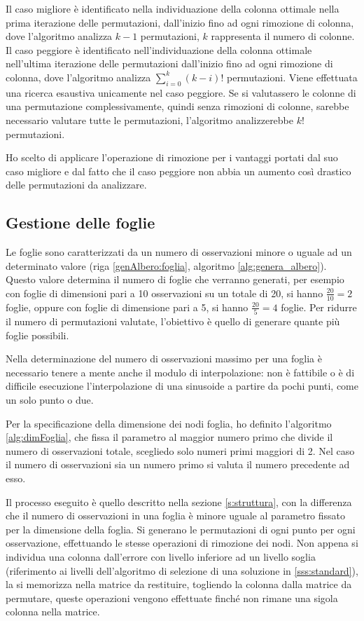 \documentclass[a4paper,12pt]{report}
\begin{document}
    Il caso migliore è identificato nella individuazione della colonna ottimale nella prima iterazione delle permutazioni, dall'inizio fino ad ogni rimozione di colonna, dove l'algoritmo analizza $k-1$ permutazioni, $k$ rappresenta il numero di colonne. Il caso peggiore è identificato nell'individuazione della colonna ottimale nell'ultima iterazione delle permutazioni dall'inizio fino ad ogni rimozione di colonna, dove l'algoritmo analizza  $\sum_{i=0}^k (k-i)!$ permutazioni.
    Viene effettuata una ricerca esaustiva unicamente nel caso peggiore.
    Se si valutassero le colonne di una permutazione complessivamente, quindi senza rimozioni di colonne, sarebbe necessario valutare tutte le permutazioni, l'algoritmo analizzerebbe $k!$ permutazioni.

    Ho scelto di applicare l'operazione di rimozione per i vantaggi portati dal suo caso migliore e dal fatto che il caso peggiore non abbia un aumento così drastico delle permutazioni da analizzare.


  \subsection{Gestione delle foglie}
  Le foglie sono caratterizzati da un numero di osservazioni minore o uguale ad un determinato valore (riga \ref{genAlbero:foglia}, algoritmo \ref{alg:genera_albero}). Questo valore determina il numero di foglie che verranno generati, per esempio con foglie di dimensioni pari a 10 osservazioni su un totale di 20, si hanno $\frac{20}{10} = 2$ foglie, oppure con foglie di dimensione pari a 5, si hanno $\frac{20}{5} = 4$ foglie. Per ridurre il numero di permutazioni valutate, l'obiettivo è quello di generare quante più foglie possibili.

  Nella determinazione del numero di osservazioni massimo per una foglia è necessario tenere a mente anche il modulo di interpolazione: non è fattibile o è di difficile esecuzione l'interpolazione di una sinusoide a partire da pochi punti, come un solo punto o due.

  Per la specificazione della dimensione dei nodi foglia, ho definito l'algoritmo \ref{alg:dimFoglia}, che fissa il parametro al maggior numero primo che divide il numero di osservazioni totale, scegliedo solo numeri primi maggiori di 2. Nel caso il numero di osservazioni sia un numero primo si valuta il numero precedente ad esso.

  Il processo eseguito è quello descritto nella sezione \ref{s:struttura}, con la differenza che il numero di osservazioni in una foglia è minore uguale al parametro fissato per la dimensione della foglia.
  Si generano le permutazioni di ogni punto per ogni osservazione, effettuando le stesse operazioni di rimozione dei nodi. Non appena si individua una colonna dall'errore con livello inferiore ad un livello soglia (riferimento ai livelli dell'algoritmo di selezione di una soluzione in \ref{sss:standard}), la si memorizza nella matrice da restituire, togliendo la colonna dalla matrice da permutare, queste operazioni vengono effettuate finché non rimane una sigola colonna nella matrice.
\end{document}
